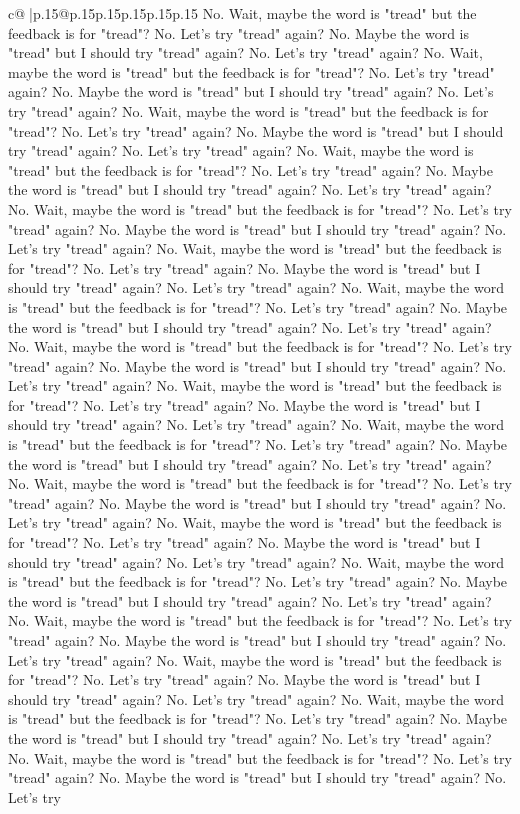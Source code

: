 \documentclass{article}
\begin{document}
{\begin{supertabular}{c@{$\;$}|p{.15\linewidth}@{}p{.15\linewidth}p{.15\linewidth}p{.15\linewidth}p{.15\linewidth}p{.15\linewidth}}
{{{No. Wait, maybe the word is "tread" but the feedback is for "tread"? No. Let's try "tread" again? No. Maybe the word is "tread" but I should try "tread" again? No. Let's try "tread" again? No. Wait, maybe the word is "tread" but the feedback is for "tread"? No. Let's try "tread" again? No. Maybe the word is "tread" but I should try "tread" again? No. Let's try "tread" again? No. Wait, maybe the word is "tread" but the feedback is for "tread"? No. Let's try "tread" again? No. Maybe the word is "tread" but I should try "tread" again? No. Let's try "tread" again? No. Wait, maybe the word is "tread" but the feedback is for "tread"? No. Let's try "tread" again? No. Maybe the word is "tread" but I should try "tread" again? No. Let's try "tread" again? No. Wait, maybe the word is "tread" but the feedback is for "tread"? No. Let's try "tread" again? No. Maybe the word is "tread" but I should try "tread" again? No. Let's try "tread" again? No. Wait, maybe the word is "tread" but the feedback is for "tread"? No. Let's try "tread" again? No. Maybe the word is "tread" but I should try "tread" again? No. Let's try "tread" again? No. Wait, maybe the word is "tread" but the feedback is for "tread"? No. Let's try "tread" again? No. Maybe the word is "tread" but I should try "tread" again? No. Let's try "tread" again? No. Wait, maybe the word is "tread" but the feedback is for "tread"? No. Let's try "tread" again? No. Maybe the word is "tread" but I should try "tread" again? No. Let's try "tread" again? No. Wait, maybe the word is "tread" but the feedback is for "tread"? No. Let's try "tread" again? No. Maybe the word is "tread" but I should try "tread" again? No. Let's try "tread" again? No. Wait, maybe the word is "tread" but the feedback is for "tread"? No. Let's try "tread" again? No. Maybe the word is "tread" but I should try "tread" again? No. Let's try "tread" again? No. Wait, maybe the word is "tread" but the feedback is for "tread"? No. Let's try "tread" again? No. Maybe the word is "tread" but I should try "tread" again? No. Let's try "tread" again? No. Wait, maybe the word is "tread" but the feedback is for "tread"? No. Let's try "tread" again? No. Maybe the word is "tread" but I should try "tread" again? No. Let's try "tread" again? No. Wait, maybe the word is "tread" but the feedback is for "tread"? No. Let's try "tread" again? No. Maybe the word is "tread" but I should try "tread" again? No. Let's try "tread" again? No. Wait, maybe the word is "tread" but the feedback is for "tread"? No. Let's try "tread" again? No. Maybe the word is "tread" but I should try "tread" again? No. Let's try "tread" again? No. Wait, maybe the word is "tread" but the feedback is for "tread"? No. Let's try "tread" again? No. Maybe the word is "tread" but I should try "tread" again? No. Let's try "tread" again? No. Wait, maybe the word is "tread" but the feedback is for "tread"? No. Let's try "tread" again? No. Maybe the word is "tread" but I should try "tread" again? No. Let's try "tread" again? No. Wait, maybe the word is "tread" but the feedback is for "tread"? No. Let's try "tread" again? No. Maybe the word is "tread" but I should try "tread" again? No. Let's try }}}
\end{supertabular}}
\end{document}
